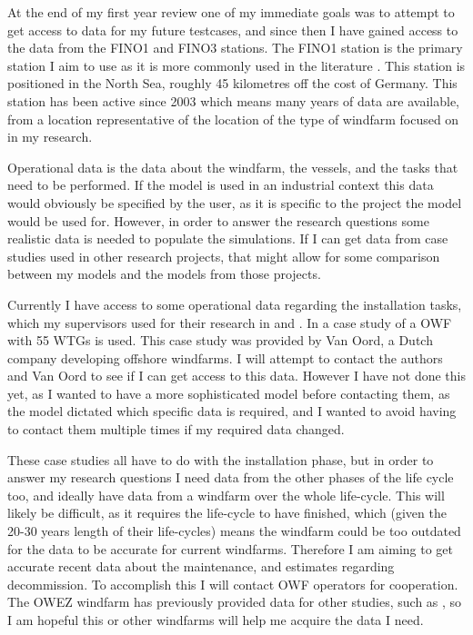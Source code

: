\documentclass[a4paper,12pt]{article}
\begin{document}
At the end of my first year review one of my immediate goals was to attempt to get access to data for my future testcases, and since then I have gained access to the data from the FINO1 and FINO3 stations. The FINO1 station \cite{fino1} is the primary station I aim to use as it is more commonly used in the literature \cite{barlow2018mixed,dinwoodie2015reference}. This station is positioned in the North Sea, roughly 45 kilometres off the cost of Germany. This station has been active since 2003 which means many years of data are available, from a location representative of the location of the type of windfarm focused on in my research. 

\bigskip

Operational data is the data about the windfarm, the vessels, and the tasks that need to be performed. If the model is used in an industrial context this data would obviously be specified by the user, as it is specific to the project the model would be used for. However, in order to answer the research questions some realistic data is needed to populate the simulations. If I can get data from case studies used in other research projects, that might allow for some comparison between my models and the models from those projects. 

Currently I have access to some operational data regarding the installation tasks, which my supervisors used for their research in \cite{barlow2018mixed} and \cite{barlow2017using}. In \cite{leontaris2016probabilistic} a case study of a OWF with 55 WTGs is used. This case study was provided by Van Oord, a Dutch company developing offshore windfarms. I will attempt to contact the authors and Van Oord to see if I can get access to this data. However I have not done this yet, as I wanted to have a more sophisticated model before contacting them, as the model dictated which specific data is required, and I wanted to avoid having to contact them multiple times if my required data changed. 

These case studies all have to do with the installation phase, but in order to answer my research questions I need data from the other phases of the life cycle too, and ideally have data from a windfarm over the whole life-cycle. This will likely be difficult, as it requires the life-cycle to have finished, which (given the 20-30 years length of their life-cycles) means the windfarm could be too outdated for the data to be accurate for current windfarms. Therefore I am aiming to get accurate recent data about the maintenance, and estimates regarding decommission. To accomplish this I will contact OWF operators for cooperation. The OWEZ windfarm has previously provided data for other studies, such as \cite{dinwoodie2012analysis}, so I am hopeful this or other windfarms will help me acquire the data I need. 
\end{document}
